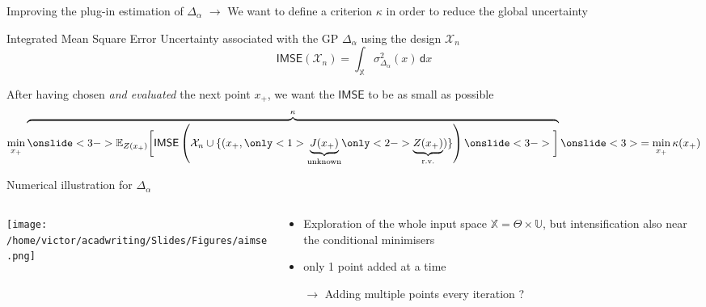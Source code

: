 \documentclass[10pt,aspectratio=169,usepdftitle=false]{beamer}
\newcommand{\Uspace}{\mathbb{U}}
\newcommand{\Kspace}{\Theta}
\newcommand{\Xspace}{\mathbb{X}}
\newcommand{\Ex}{\mathbb{E}}
\begin{document}
\begin{frame}{Improving the plug-in estimation of $\Delta_{\alpha}$}
  $\rightarrow$ We want to define a criterion $\kappa$ in order to
  reduce the \alert{global} uncertainty
  \begin{block}{Integrated Mean Square Error}
    Uncertainty associated with the GP $\Delta_{\alpha}$ using the design $\mathcal{X}_n$
    \begin{equation}
    \mathsf{IMSE}(\mathcal{X}_n) = \int_{\Xspace}  \sigma^2_{\Delta_{\alpha}}(x)\,\mathsf{d}x
  \end{equation}
  \end{block}
  
  After having chosen \emph{and evaluated} the next point $x_{+}$, we
  want the $\mathsf{IMSE}$ to be as small as possible
  \begin{equation}
    \min_{x_{+}} \overbrace{\onslide<3->{\Ex_{Z(x_+)}\bigg[}\mathsf{IMSE}\left(\mathcal{X}_n \cup \{(x_{+}, \only<1>{\underbrace{J(x_{+})}_{\text{unknown}}} \only<2->{\underbrace{Z(x_+)}_{\text{r.v.}}})\}\right) \onslide<3->{\bigg]}}^{\kappa} \onslide<3>{= \min_{x_+} \kappa(x_{+})}
  \end{equation}
\end{frame}
\begin{frame}{Numerical illustration for $\Delta_{\alpha}$}
  \begin{columns}
    \begin{column}{0.5\textwidth}
  \begin{center}
  \texttt{[image: /home/victor/acadwriting/Slides/Figures/aimse.png]}
\end{center}
\end{column}
\begin{column}{0.5\textwidth}
  \begin{itemize}
  \item Exploration of the whole input space
    $\Xspace=\Kspace \times \Uspace$, but intensification also near
    the conditional minimisers
\item only 1 point added at a time
\item[$\rightarrow$] Adding multiple points every iteration ? 
\end{itemize}
\end{column}
\end{columns}
\end{frame}
\end{document}
